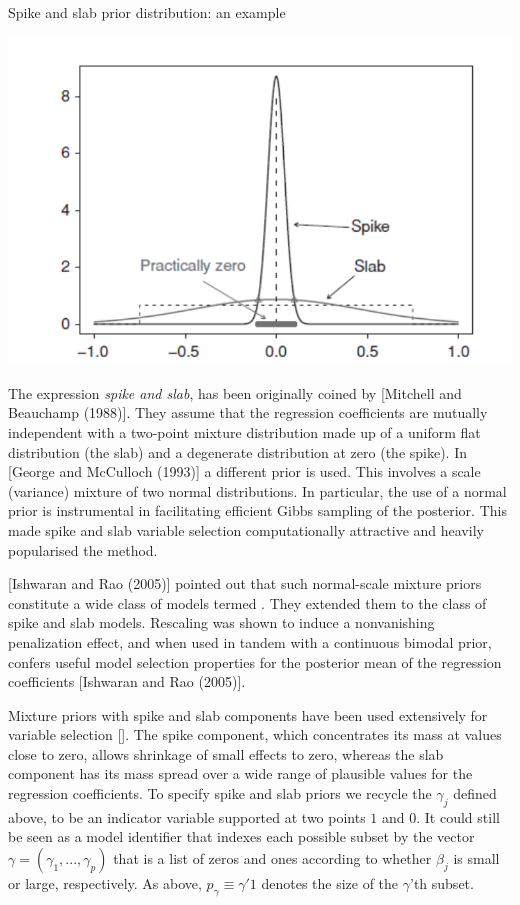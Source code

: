 \documentclass[11 pt]{article}
\begin{document}
\begin{multicols}{2}
\begin{figurehere}
\centering
\caption{Spike and slab prior distribution: an example}
    \includegraphics[width=\linewidth, keepaspectratio]{spike.PNG}
\end{figurehere}

The expression \textit{spike and slab}, has been originally coined by [Mitchell and Beauchamp (1988)]. They assume that the regression coefficients are mutually independent with a two-point mixture distribution made up of a uniform flat distribution (the slab) and a degenerate distribution at zero (the spike). In [George and McCulloch (1993)] a different prior is used. This involves a scale (variance) mixture of two normal distributions. In particular, the use of a normal prior is instrumental in facilitating efficient Gibbs sampling of the posterior. This made spike and slab variable selection computationally attractive and heavily popularised the method. 

[Ishwaran and Rao (2005)] pointed out that such normal-scale mixture priors constitute a wide class of models termed . They extended them to the class of  spike and slab models. Rescaling was shown to induce a nonvanishing penalization effect, and when used in tandem with a continuous bimodal prior, confers useful model selection properties for the posterior mean of the regression coefficients [Ishwaran and Rao (2005)].

Mixture priors with spike and slab components have been used extensively for variable selection [\cite{Spike2011}]. The spike component, which concentrates its mass at values close to zero, allows shrinkage of small effects to zero, whereas the slab component has its mass spread over a wide range of plausible values for the regression coefficients. To specify spike and slab priors we recycle the $\gamma_j$ defined above, to be an indicator variable supported at two points $1$ and $0$. It could still be seen as a model identifier that indexes each possible subset by the vector $\gamma = (\gamma_1,..., \gamma_p)$ that is a list of zeros and ones according to whether $\beta_j$ is small or large, respectively. As above, $p_\gamma \equiv \gamma'1$  denotes the size of the $\gamma$'th subset.


\end{multicols}
\end{document}
